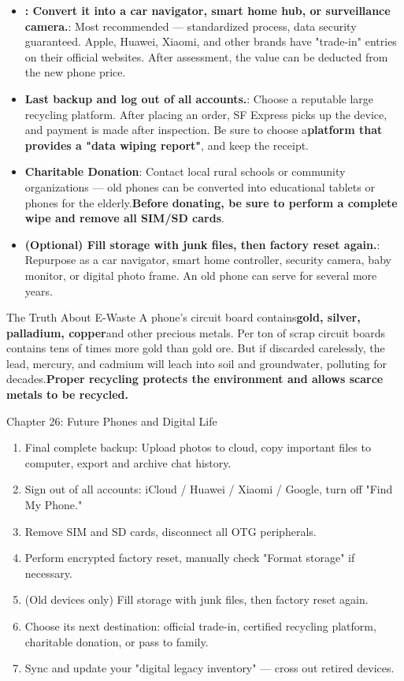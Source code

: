 \begin{itemize}
  \item \textbf{: Convert it into a car navigator, smart home hub, or surveillance camera.}: Most recommended — standardized process, data security guaranteed. Apple, Huawei, Xiaomi, and other brands have "trade-in" entries on their official websites. After assessment, the value can be deducted from the new phone price.
  \item \textbf{Last backup and log out of all accounts.}: Choose a reputable large recycling platform. After placing an order, SF Express picks up the device, and payment is made after inspection. Be sure to choose a\textbf{platform that provides a "data wiping report"}, and keep the receipt.
  \item \textbf{Charitable Donation}: Contact local rural schools or community organizations — old phones can be converted into educational tablets or phones for the elderly.\textbf{Before donating, be sure to perform a complete wipe and remove all SIM/SD cards}.
  \item \textbf{(Optional) Fill storage with junk files, then factory reset again.}: Repurpose as a car navigator, smart home controller, security camera, baby monitor, or digital photo frame. An old phone can serve for several more years.
\end{itemize}

\begin{tcbinfo}{The Truth About E-Waste}
A phone's circuit board contains\textbf{gold, silver, palladium, copper}and other precious metals. Per ton of scrap circuit boards contains tens of times more gold than gold ore. But if discarded carelessly, the lead, mercury, and cadmium will leach into soil and groundwater, polluting for decades.\textbf{Proper recycling protects the environment and allows scarce metals to be recycled.}

\end{tcbinfo}

\begin{tcbpractice}{Chapter 26: Future Phones and Digital Life}
\begin{enumerate}
  \item Final complete backup: Upload photos to cloud, copy important files to computer, export and archive chat history.
  \item Sign out of all accounts: iCloud / Huawei / Xiaomi / Google, turn off "Find My Phone."
  \item Remove SIM and SD cards, disconnect all OTG peripherals.
  \item Perform encrypted factory reset, manually check "Format storage" if necessary.
  \item (Old devices only) Fill storage with junk files, then factory reset again.
  \item Choose its next destination: official trade-in, certified recycling platform, charitable donation, or pass to family.
  \item Sync and update your "digital legacy inventory" — cross out retired devices.
\end{enumerate}

\end{tcbpractice}

